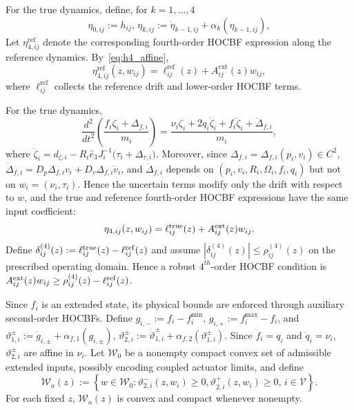 \documentclass[journal,twoside,web]{ieeecolor}
\begin{document}
For the true dynamics, define, for $k=1,\ldots,4$
\begin{equation}
    \eta_{0,ij}:=h_{ij},\,
    \eta_{k,ij}:=
    \dot\eta_{k-1,ij}
    +\alpha_k(\eta_{k-1,ij}),
    \label{eq:eta_recursion}
\end{equation}
Let $\eta_{4,ij}^{\mathrm{ref}}$ denote the corresponding
fourth-order HOCBF expression along the reference dynamics.
By~\eqref{eq:h4_affine},
\begin{equation}
    \eta_{4,ij}^{\mathrm{ref}}(z,w_{ij})
    =
    \ell_{ij}^{\mathrm{ref}}(z)
    +
    A_{ij}^{\mathrm{ext}}(z)w_{ij},
    \label{eq:eta4_affine}
\end{equation}
where $\ell_{ij}^{\mathrm{ref}}$ collects the reference drift and
lower-order HOCBF terms.

For the true dynamics,
\[
\frac{d^2}{dt^2}\!\left(
\frac{f_i\zeta_i+\Delta_{f,i}}{m_i}\right)
=
\frac{\nu_i\zeta_i+2q_i\dot\zeta_i
+f_i\ddot\zeta_i+\ddot\Delta_{f,i}}{m_i},
\]
where $\ddot\zeta_i
=
d_{\zeta,i}
-R_i\widehat e_3J_i^{-1}
\big(\tau_i+\Delta_{\tau,i}\big)$. Moreover, since $\Delta_{f,i}=\Delta_{f,i}(p_i,v_i)\in C^2$, $\dot\Delta_{f,i}
=
D_p\Delta_{f,i}v_i
+D_v\Delta_{f,i}\dot v_i$, and $\ddot\Delta_{f,i}$ depends on
$(p_i,v_i,R_i,\Omega_i,f_i,q_i)$ but not on
$w_i=(\nu_i,\tau_i)$. Hence the uncertain terms modify only
the drift with respect to $w$, and the true and reference
fourth-order HOCBF expressions have the same input coefficient:
\[
\eta_{4,ij}(z,w_{ij})
=
\ell^{\rm true}_{ij}(z)+A^{\rm ext}_{ij}(z)w_{ij}.
\]
Define
$\delta_{ij}^{(4)}(z):=
\ell_{ij}^{\rm true}(z)-\ell_{ij}^{\mathrm{ref}}(z)$
and assume $|\delta_{ij}^{(4)}(z)|
\le
\rho_{ij}^{(4)}(z)$ on the prescribed operating domain. Hence a robust
$4^{th}$-order HOCBF condition is
$A_{ij}^{\rm ext}(z)w_{ij}
    \ge
    \rho_{ij}^{(4)}(z)-\ell_{ij}^{\mathrm{ref}}(z)$.


Since $f_i$ is an extended state, its physical bounds are enforced
through auxiliary second-order HOCBFs. Define
$g_{i,-}:=f_i-f_i^{\min},\,
g_{i,+}:=f_i^{\max}-f_i$, and $\vartheta_{1,i}^{\pm}
:=\dot g_{i,\pm}+\alpha_{f,1}(g_{i,\pm}),\,
\vartheta_{2,i}^{\pm}
:=\dot\vartheta_{1,i}^{\pm}
+\alpha_{f,2}(\vartheta_{1,i}^{\pm})$. Since $\dot f_i=q_i$ and $\dot q_i=\nu_i$,
$\vartheta_{2,i}^{\pm}$ are affine in $\nu_i$. Let $\mathcal W_0$ be a nonempty compact
convex set of admissible extended inputs, possibly encoding
coupled actuator limits, and define
\[
\mathcal W_a(z):=
\left\{
w\in\mathcal W_0:
\vartheta_{2,i}^{-}(z,w_i)\ge0,
\vartheta_{2,i}^{+}(z,w_i)\ge0,\, i\in\mathcal V
\right\}.
\]
For each fixed $z$, $\mathcal W_a(z)$ is convex and compact
whenever nonempty.
\end{document}
